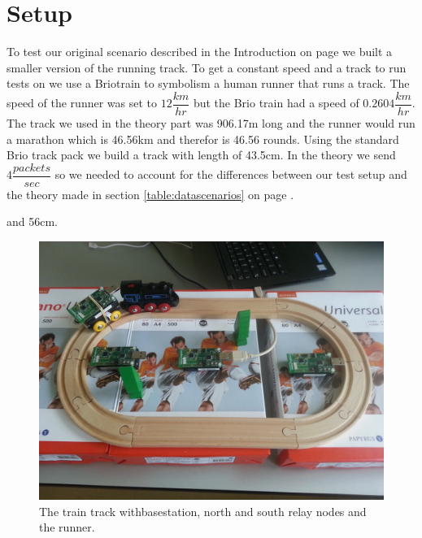 \section{Setup}\label{sc:setup}
To test our original scenario described in the Introduction on page \pageref{ch:introduction} we built a smaller version of the running track. To get a constant speed and a track to run tests on we use a Brio\texttrademark train to symbolism a human runner that runs a track. The speed of the runner was set to $12\dfrac{km}{hr}$ but the Brio train had a speed of $0.2604\dfrac{km}{hr}$. The track we used in the theory part was 906.17m long and the runner would run a marathon which is 46.56km and therefor is 46.56 rounds. Using the standard Brio track pack we build a track with length of 43.5cm. In the theory we send $4\dfrac{packets}{sec}$ so we needed to account for the differences between our test setup and the theory made in section \ref{table:datascenarios} on page \pageref{table:scenarios}.





 and 56cm. 


\begin{figure}[H]
	\centering
	\includegraphics[width=1\linewidth]{testAndPerformance/setup/setup}
	\caption{The train track withbasestation, north and south relay nodes and the runner. }
	\label{fig:testSetup}
\end{figure}

